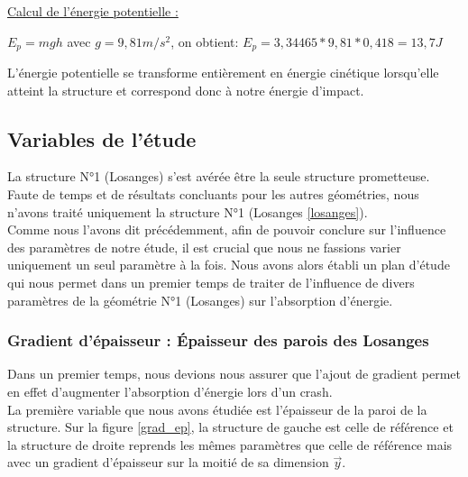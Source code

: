 \documentclass[a4paper]{article}
\begin{document}
	\underline{Calcul de l'énergie potentielle :}\\
	\label{energie_impact}
	\begin{center}
		$E_{p} = mgh$ avec $g = 9,81 m/s^{2}$, on obtient: $E_{p} = 3,34465 * 9,81 * 0,418 = 13,7 J$
	\end{center}

	L'énergie potentielle se transforme entièrement en énergie cinétique lorsqu'elle atteint la structure et correspond donc à notre énergie d'impact.
	\newpage
	
	\subsection{Variables de l'étude}
	\label{variables_etude}
	\hspace{0.5cm}La structure N°1 (Losanges) s'est avérée être la seule structure prometteuse. Faute de temps et de résultats concluants pour les autres géométries, nous n’avons traité uniquement la structure N°1 (Losanges \ref{losanges}).\\
		
	Comme nous l’avons dit précédemment, afin de pouvoir conclure sur l’influence des paramètres de notre étude, il est crucial que nous ne fassions varier uniquement un seul paramètre à la fois. Nous avons alors établi un plan d’étude qui nous permet dans un premier temps de traiter de l’influence de divers paramètres de la géométrie N°1 (Losanges) sur l’absorption d’énergie.\\
	
	\subsubsection{Gradient d'épaisseur : Épaisseur des parois des Losanges}
	\hspace{0.5cm}Dans un premier temps, nous devions nous assurer que l'ajout de gradient permet en effet d'augmenter l'absorption d'énergie lors d'un crash.\\
	
	La première variable que nous avons étudiée est l'épaisseur de la paroi de la structure. Sur la figure \ref{grad_ep}, la structure de gauche est celle de référence et la structure de droite reprends les mêmes paramètres que celle de référence mais avec un gradient d'épaisseur sur la moitié de sa dimension $\vec{y}$.
	
\end{document}
